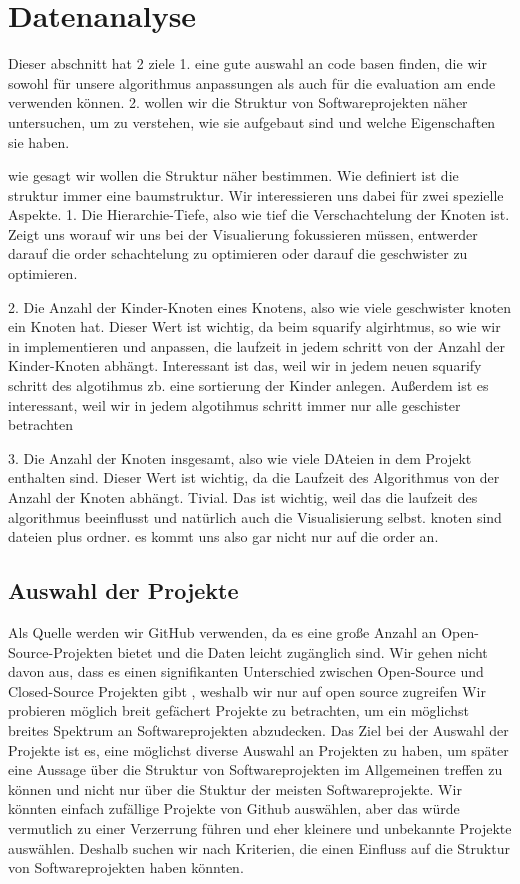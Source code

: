\section{Datenanalyse} \label{sec:datenAnalyse}
Dieser abschnitt hat 2 ziele 1. eine gute auswahl an code basen finden, die wir sowohl für unsere algorithmus anpassungen als auch für die evaluation am ende verwenden können.
2. wollen wir die Struktur von Softwareprojekten näher untersuchen, um zu verstehen, wie sie aufgebaut sind und welche Eigenschaften sie haben.

wie gesagt wir wollen die Struktur näher bestimmen. Wie definiert ist die struktur immer eine baumstruktur. 
Wir interessieren uns dabei für zwei spezielle Aspekte. 
1. Die Hierarchie-Tiefe, also wie tief die Verschachtelung der Knoten ist. 
Zeigt uns worauf wir uns bei der Visualierung fokussieren müssen, entwerder darauf die order schachtelung zu optimieren oder darauf die geschwister zu optimieren.

2. Die Anzahl der Kinder-Knoten eines Knotens, also wie viele geschwister knoten ein Knoten hat. Dieser Wert ist wichtig, da beim squarify algirhtmus, so wie wir in implementieren und anpassen, die laufzeit in jedem schritt von der Anzahl der Kinder-Knoten abhängt.
Interessant ist das, weil wir in jedem neuen squarify schritt des algotihmus zb. eine sortierung der Kinder anlegen. Außerdem ist es interessant, weil wir in jedem algotihmus schritt immer nur alle geschister betrachten

3. Die Anzahl der Knoten insgesamt, also wie viele DAteien in dem Projekt enthalten sind. Dieser Wert ist wichtig, da die Laufzeit des Algorithmus von der Anzahl der Knoten abhängt.
Tivial. Das ist wichtig, weil das die laufzeit des algorithmus beeinflusst und natürlich auch die Visualisierung selbst.
knoten sind dateien plus ordner. es kommt uns also gar nicht nur auf die order an.



\subsection{Auswahl der Projekte} \label{sec:auswahlDerProjekte}
Als Quelle werden wir GitHub verwenden, da es eine große Anzahl an Open-Source-Projekten bietet und die Daten leicht zugänglich sind.
Wir gehen nicht davon aus, dass es einen signifikanten Unterschied zwischen Open-Source und Closed-Source Projekten gibt \cite{closedVsOpenSource, closedVsOpenSource2}, weshalb wir nur auf open source zugreifen 
Wir probieren möglich breit gefächert Projekte zu betrachten, um ein möglichst breites Spektrum an Softwareprojekten abzudecken. 
Das Ziel bei der Auswahl der Projekte ist es, eine möglichst diverse Auswahl an Projekten zu haben, um später eine Aussage über die Struktur von Softwareprojekten im Allgemeinen treffen zu können und nicht nur über die Stuktur der meisten Softwareprojekte. Wir könnten einfach zufällige Projekte von Github auswählen, aber das würde vermutlich zu einer Verzerrung führen und eher kleinere und unbekannte Projekte auswählen.
Deshalb suchen wir nach Kriterien, die einen Einfluss auf die Struktur von Softwareprojekten haben könnten. 

